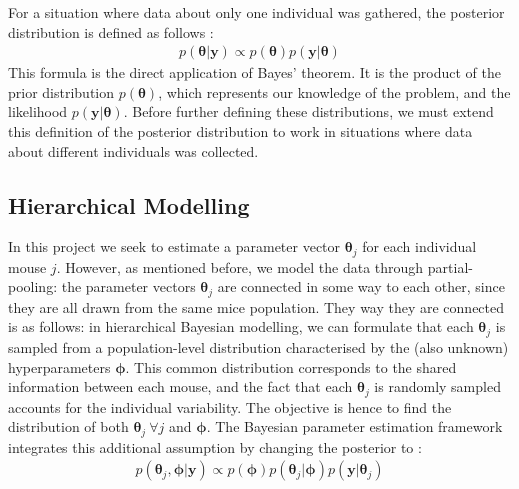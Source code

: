 \documentclass[11pt]{article}
\begin{document}
For a situation where data about only one individual was gathered, the posterior distribution is defined as follows \cite{tbk_gelman}:
\begin{align*}
    p(\boldsymbol{\theta} | \boldsymbol{y}) \propto p(\boldsymbol{\theta})p(\boldsymbol{y}|\boldsymbol{\theta})
\end{align*} 
This formula is the direct application of Bayes' theorem. It is the product of the prior distribution $p(\boldsymbol{\theta})$, which represents our knowledge of the problem, and the likelihood $p(\boldsymbol{y} | \boldsymbol{\theta})$. Before further defining these distributions, we must extend this definition of the posterior distribution to work in situations where data about different individuals was collected. 

\subsection{Hierarchical Modelling}\label{sec:hierch}

In this project we seek to estimate a parameter vector $\boldsymbol{\theta}_j$ for each individual mouse $j$. However, as mentioned before, we model the data through partial-pooling: the parameter vectors $\boldsymbol{\theta}_j$ are connected in some way to each other, since they are all drawn from the same mice population. They way they are connected is as follows: in hierarchical Bayesian modelling, we can formulate that each $\boldsymbol{\theta}_j$ is sampled from a population-level distribution characterised by the (also unknown) hyperparameters $\boldsymbol{\phi}$. This common distribution corresponds to the shared information between each mouse, and the fact that each $\boldsymbol{\theta}_j$ is randomly sampled accounts for the individual variability. The objective is hence to find the distribution of both $\boldsymbol{\theta}_j~\forall j$ and $\boldsymbol{\phi}$. The Bayesian parameter estimation framework integrates this additional assumption by changing the posterior to \cite{tbk_gelman}:
\begin{align*}
    p(\boldsymbol{\theta}_j, \boldsymbol{\phi} | \boldsymbol{y}) \propto p(\boldsymbol{\phi})p(\boldsymbol{\theta}_j|\boldsymbol{\phi})p(\boldsymbol{y}|\boldsymbol{\theta}_j)
\end{align*} 
\end{document}
